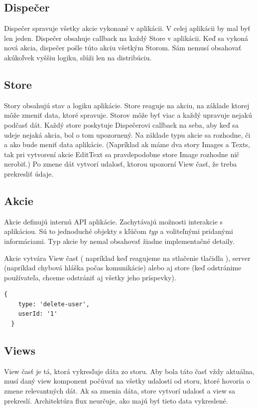 \subsection{Dispečer}
Dispečer spravuje všetky akcie vykonané v aplikácii. V celej aplikácii by mal byť len jeden. Dispečer obsahuje callback %
na každý Store v aplikácii. Keď sa vykoná nová akcia, dispečer pošle túto akciu všetkým Storom. Sám nemusí obsahovať akúkoľvek vyššiu logiku, slúži len na distribúciu.

\subsection{Store}
Story obsahujú stav a logiku aplikácie. Store reaguje na akciu, na základe ktorej môže zmeniť data, ktoré spravuje. Storov môže byť viac a každý upravuje nejakú podčasť dát. Každý store poskytuje Dispečerovi callback na seba, aby keď sa udeje nejaká akcia, bol o tom upozornený. Na základe typu akcie sa rozhodne, či a ako bude meniť data aplikácie. (Napríklad ak máme dva story Images a Texts, tak pri vytvorení akcie EditText sa pravdepodobne store Image rozhodne nič nerobiť.) Po zmene dát vytvorí udalosť, ktorou upozorní View časť, že treba prekresliť údaje.

\subsection{Akcie}
Akcie definujú internú API aplikácie. Zachytávajú možnosti interakcie s aplikáciou. Sú to jednoduché objekty s kľúčom \emph{typ} a voliteľnými pridanými informáciami. Typ akcie by nemal obsahovať žiadne implementačné detaily.

Akcie vytvára View časť ( napríklad keď reagujeme na stlačenie tlačidla ), %
server (napríklad chybová hláška počas komunikácie) %
alebo aj store (keď odstránime používateľa, chceme odstrániť aj všetky jeho príspevky).

\begin{lstlisting}[caption=Akcia vo Flux architektúre]
  {
  	type: 'delete-user',
  	userId: '1'
  }
\end{lstlisting}

\subsection{Views}%
View časť je tá, ktorá vykresľuje dáta zo storu. Aby bola táto časť vždy aktuálna, musí daný view komponent počúvať na všetky udalosti od storu, ktoré hovoria o zmene relevantných dát. Ak sa zmenia dáta, store vytvorí udalosť a view sa prekreslí. Architektúra flux neurčuje, ako majú byť tieto data vykreslené.







